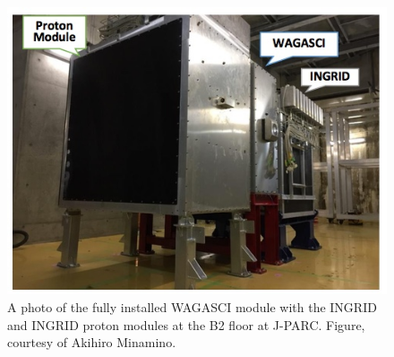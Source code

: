 \begin{figure}
\centering
\includegraphics[width=\textwidth]{figures/NeutrinoChap/NuFactTalk/WAGASCIlayout2.jpeg}
    \caption{A photo of the fully installed WAGASCI module with the INGRID and INGRID proton modules at the B2 floor at J-PARC. Figure, courtesy of Akihiro Minamino.}
    \label{fig:installed}
\end{figure}





